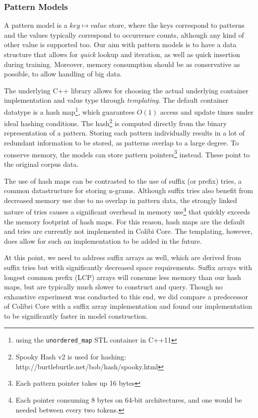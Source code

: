 \documentclass[a4paper,12pt]{article}
\begin{document}
\subsubsection{Pattern Models}

A pattern model is a $key \mapsto value$ store, where the keys correspond to
patterns and the values typically correspond to occurrence counts, although any
kind of other value is supported too. Our aim with pattern models is to have a
data structure that allows for \emph{quick} lookup and iteration, as well as
quick insertion during training. Moreover, memory consumption should be as
conservative as possible, to allow handling of big data.

The underlying C++ library allows for choosing the actual underlying container
implementation and value type through \emph{templating}. The default container
datatype is a hash map\footnote{using the \texttt{unordered\_map} STL container
in C++11}, which guarantees $O(1)$ access and update times under ideal hashing
conditions. The hash\footnote{Spooky Hash v2 is used for hashing:
http://burtleburtle.net/bob/hash/spooky.html} is computed directly from the
binary representation of a pattern. Storing each pattern individually results
in a lot of redundant information to be stored, as patterns overlap to a large
degree. To conserve memory, the models can store pattern pointers\footnote{Each
pattern pointer takes up 16 bytes} instead. These point to the original corpus
data.

The use of hash maps can be contrasted to the use of suffix (or prefix) tries,
a common datastructure for storing n-grams. Although suffix tries also benefit
from decreased memory use due to no overlap in pattern data, the strongly
linked nature of tries causes a significant overhead in memory
use\footnote{Each pointer consuming 8 bytes on 64-bit architectures, and one
would be needed between every two tokens.} that quickly exceeds the memory
footprint of hash maps.  For this reason, hash maps are the default and tries
are currently not implemented in Colibi Core. The templating, however, does
allow for such an implementation to be added in the future.

At this point, we need to address suffix arrays \cite{Manber90} as well, which
are derived from suffix tries but with significantly decreased space
requirements. Suffix arrays with longest common prefix (LCP) arrays will
consume less memory than our hash maps, but are typically much slower to
construct and query. Though no exhaustive experiment was conducted to this
end, we did compare a predecessor of Colibri Core with a suffix array implementation
\cite{Stehouwer10} and found our implementation to be significantly faster in model
construction.
\end{document}
